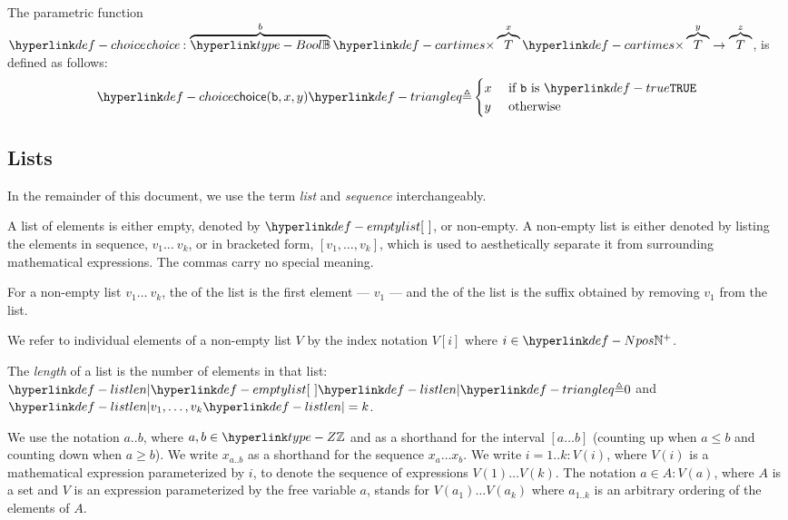 \hypertarget{def-choice}{}
\begin{definition}[Choice]
The parametric function $\choicename : \overname{\Bool}{b} \cartimes \overname{T}{x} \cartimes \overname{T}{y} \rightarrow \overname{T}{z}$,
is defined as follows:
\[
  \choice{\vb}{x}{y} \triangleq
  \begin{cases}
    x & \text{ if }\vb \text{ is }\True\\
    y & \text{ otherwise}\\
  \end{cases}
\]
\end{definition}

\subsection{Lists}
In the remainder of this document, we use the term \emph{list} and \emph{sequence} interchangeably.

A list of elements \hypertarget{def-emptylist}{is either empty, denoted by $\emptylist$}, or non-empty.
A non-empty list is either denoted by listing the elements in sequence, $v_1 \ldots\ v_k$,
or in bracketed form, $[v_1,\ldots,v_k]$, which is used to aesthetically separate it from surrounding mathematical expressions.
The commas carry no special meaning.

\hypertarget{def-head}{}
\hypertarget{def-tail}{}
For a non-empty list $v_1 \ldots\ v_k$, the \emph{\head} of the list is the first element --- $v_1$ ---
and the \emph{\tail} of the list is the suffix obtained by removing $v_1$ from the list.

We refer to individual elements of a non-empty list $V$ by the index notation $V[i]$ where $i\in\Npos$.

\hypertarget{def-listlen}{}
\begin{definition}
The \emph{length} of a list is the number of elements in that list:
$\listlen{\emptylist} \triangleq 0$ and $\listlen{v_1,\ldots,v_k}=k$.
\end{definition}

We use the notation $a..b$, where $a,b\in\Z$ and as a shorthand for the interval $[a\ldots b]$
(counting up when $a \leq b$ and counting down when $a \geq b$).
We write $x_{a..b}$ as a shorthand for the sequence $x_a \ldots x_b$.
%
We write $i=1..k: V(i)$, where $V(i)$ is a mathematical expression parameterized by $i$,
to denote the sequence of expressions $V(1) \ldots V(k)$.
The notation $a \in A: V(a)$, where $A$ is a set and $V$ is an expression parameterized by the free variable $a$,
stands for $V(a_1) \ldots V(a_k)$ where $a_{1..k}$ is an arbitrary ordering of the elements of $A$.

